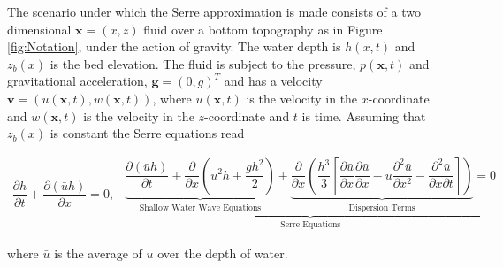 \documentclass[SingleSpace,12pt,Proceedings]{Serre_ASCE}
\begin{document}
The scenario under which the Serre approximation is made consists of a two dimensional $\textbf{x} = (x,z)$ fluid over a bottom topography as in Figure \ref{fig:Notation}, under the action of gravity. The water depth is $h(x,t)$ and $z_b(x)$ is the bed elevation. The fluid is subject to the pressure, $p(\textbf{x},t)$ and gravitational acceleration, $\textbf{g} = (0,g)^T$ and has a velocity $\textbf{v} = (u(\textbf{x},t),w(\textbf{x},t))$, where $u(\textbf{x},t)$ is the velocity in the $x$-coordinate and $w(\textbf{x},t)$ is the velocity in the $z$-coordinate and $t$ is time. Assuming that $z_b(x)$ is constant the Serre equations read \cite{Guyenne-etal-2014-169,Zoppou-2014}
\begin{linenomath*}
\begin{subequations}\label{eq:Serre_conservative_form}
\begin{gather}
\dfrac{\partial h}{\partial t} + \dfrac{\partial (\bar{u}h)}{\partial x} = 0,
\label{eq:Serre_continuity}
\end{gather}
\begin{gather}
\underbrace{\underbrace{\dfrac{\partial (\bar{u}h)}{\partial t} + \dfrac{\partial}{\partial x} \left ( \bar{u}^2h + \dfrac{gh^2}{2}\right )}_{\text{Shallow Water Wave Equations}} + \underbrace{\dfrac{\partial}{\partial x} \left (  \dfrac{h^3}{3} \left [ \dfrac{\partial \bar{u} }{\partial x} \dfrac{\partial \bar{u}}{\partial x} - \bar{u} \dfrac{\partial^2 \bar{u}}{\partial x^2}  - \dfrac{\partial^2 \bar{u}}{\partial x \partial t}\right ] \right )}_{\text{Dispersion Terms}} = 0}_{\text{Serre Equations}}
\label{eq:Serre_momentum}
\end{gather}
\end{subequations}
\end{linenomath*}
where $\bar{u}$ is the average of $u$ over the depth of water.
\end{document}
